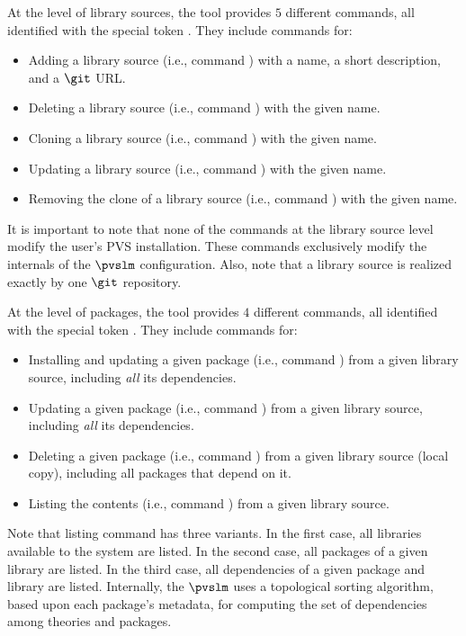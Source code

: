 At the level of library sources, the tool provides $5$ different
commands, all identified with the special token . They
include commands for:

\begin{itemize}
  \item Adding a library source (i.e., command ) with a
    name, a short description, and a $\git$ URL.
  \item Deleting a library source (i.e., command ) with
    the given name.
  \item Cloning a library source (i.e., command ) with the
    given name.
  \item Updating a library source (i.e., command ) with
    the given name.
  \item Removing the clone of a library source (i.e., command
    ) with the given name.
\end{itemize}

It is important to note that none of the commands at the library
source level modify the user's PVS installation. These commands
exclusively modify the internals of the $\pvslm$ configuration. Also,
note that a library source is realized exactly by one $\git$
repository.

At the level of packages, the tool provides $4$ different
commands, all identified with the special token . They
include commands for:

\begin{itemize}
  \item Installing and updating a given package (i.e., command
    ) from a given library source, including {\em all} its
    dependencies.
  \item Updating a given package (i.e., command ) from a given
    library source, including {\em all} its dependencies.
  \item Deleting a given package (i.e., command ) from a given
    library source (local copy), including all packages that depend on
    it.
  \item Listing the contents (i.e., command ) from a given
    library source.
\end{itemize}

Note that listing command has three variants. In the first case, all
libraries available to the system are listed. In the second case, all
packages of a given library are listed. In the third case, all
dependencies of a given package and library are listed. Internally,
the $\pvslm$ uses a topological sorting algorithm, based upon each
package's metadata, for computing the set of dependencies among
theories and packages.
